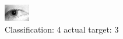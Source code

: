 \begin{figure}[h!]
\begin{center}
\includegraphics[width=0.60\columnwidth]{figures/ID1285_class_4_target_3.png}
\end{center}
\caption{ Classification: 4 actual target: 3}
\label{fig:ID1285_class_4_target_3}
\end{figure}
